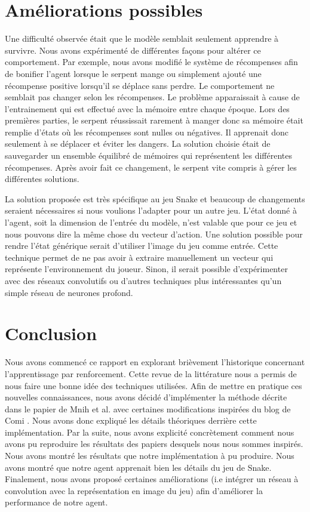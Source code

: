 \documentclass{article}
\begin{document}
\section{Améliorations possibles}

Une difficulté observée était que le modèle semblait seulement apprendre à survivre. Nous avons expérimenté de différentes façons pour altérer ce comportement. Par exemple, nous avons modifié le système de récompenses afin de bonifier l’agent lorsque le serpent mange ou simplement ajouté une récompense positive lorsqu’il se déplace sans perdre. Le comportement ne semblait pas changer selon les récompenses. Le problème apparaissait à cause de l’entrainement qui est effectué avec la mémoire entre chaque époque. Lors des premières parties, le serpent réussissait rarement à manger donc sa mémoire était remplie d’états où les récompenses sont nulles ou négatives. Il apprenait donc seulement à se déplacer et éviter les dangers. La solution choisie était de sauvegarder un ensemble équilibré de mémoires qui représentent les différentes récompenses. Après avoir fait ce changement, le serpent vite compris à gérer les différentes solutions.

La solution proposée est très spécifique au jeu Snake et beaucoup de changements seraient nécessaires si nous voulions l’adapter pour un autre jeu. L’état donné à l’agent, soit la dimension de l’entrée du modèle, n’est valable que pour ce jeu et nous pouvons dire la même chose du vecteur d’action. Une solution possible pour rendre l’état générique serait d’utiliser l’image du jeu comme entrée. Cette technique permet de ne pas avoir à extraire manuellement un vecteur qui représente l’environnement du joueur. Sinon, il serait possible d’expérimenter avec des réseaux convolutifs ou d’autres techniques plus intéressantes qu’un simple réseau de neurones profond.

\section{Conclusion}

Nous avons commencé ce rapport en explorant brièvement l'historique concernant l'apprentissage par renforcement. Cette revue de la littérature nous a permis de nous faire une bonne idée des techniques utilisées. Afin de mettre en pratique ces nouvelles connaissances, nous avons décidé d'implémenter la méthode décrite dans le papier de Mnih et al. \cite{DBLP:journals/corr/MnihKSGAWR13} avec certaines modifications inspirées du blog de Comi \cite{comi_2020}. Nous avons donc expliqué les détails théoriques derrière cette implémentation. Par la suite, nous avons explicité concrètement comment nous avons pu reproduire les résultats des papiers desquels nous nous sommes inspirés. Nous avons montré les résultats que notre implémentation à pu produire. Nous avons montré que notre agent apprenait bien les détails du jeu de Snake. Finalement, nous avons proposé certaines améliorations (i.e intégrer un réseau à convolution avec la représentation en image du jeu) afin d'améliorer la performance de notre agent. 

\printbibliography
\end{document}
